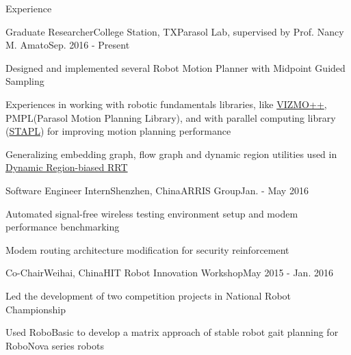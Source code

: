 \documentclass{resume} %
\begin{document}

\begin{rSection}{Experience}
\begin{rSubsection}{Graduate Researcher}{College Station, TX}{Parasol Lab, supervised by Prof. Nancy M. Amato}{Sep. 2016 - Present}
\item Designed and implemented several Robot Motion Planner with Midpoint Guided Sampling
\item Experiences in working with robotic fundamentals libraries, like \href{https://parasol.tamu.edu/groups/amatogroup/research/UserGuided/Old/vizmo++/}{VIZMO++}, PMPL(Parasol Motion Planning Library), and with parallel computing library (\href{https://parasol.tamu.edu/groups/rwergergroup/research/stapl/}{STAPL}) for improving motion planning performance
\item Generalizing embedding graph, flow graph and dynamic region utilities used in \href{http://wafr2016.berkeley.edu/papers/WAFR_2016_paper_36.pdf}{Dynamic Region-biased RRT}
\end{rSubsection}

\begin{rSubsection}{Software Engineer Intern}{Shenzhen, China}{ARRIS Group}{Jan. - May 2016}
\item Automated signal-free wireless testing environment setup and modem performance benchmarking
\item Modem routing architecture modification for security reinforcement
\end{rSubsection}
\begin{rSubsection}{Co-Chair}{Weihai, China}{HIT Robot Innovation Workshop}{May 2015 - Jan. 2016}
\item Led the development of two competition projects in National Robot Championship
\item Used RoboBasic to develop a matrix approach of stable robot gait planning for RoboNova series robots
\end{rSubsection}
\end{rSection}
\end{document}
